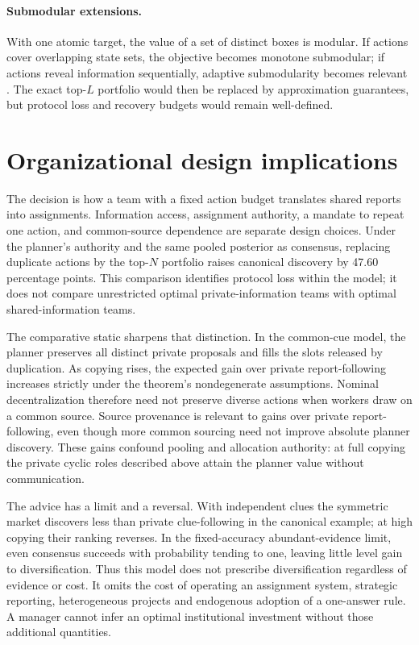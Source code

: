 \documentclass[11pt]{article}
\theoremstyle{definition}
\theoremstyle{remark}
\newcommand{\1}{\mathbf{1}}
\begin{document}
\paragraph{Submodular extensions.}
With one atomic target, the value of a set of distinct boxes is modular. If actions cover overlapping state sets, the objective becomes monotone submodular; if actions reveal information sequentially, adaptive submodularity becomes relevant \citep{NemhauserEtAl1978,GolovinKrause2011}. The exact top-$L$ portfolio would then be replaced by approximation guarantees, but protocol loss and recovery budgets would remain well-defined.

\section{Organizational design implications}
\label{sec:implications}

The decision is how a team with a fixed action budget translates shared reports into assignments. Information access, assignment authority, a mandate to repeat one action, and common-source dependence are separate design choices. Under the planner's authority and the same pooled posterior as consensus, replacing duplicate actions by the top-$N$ portfolio raises canonical discovery by 47.60 percentage points. This comparison identifies protocol loss within the model; it does not compare unrestricted optimal private-information teams with optimal shared-information teams.

The comparative static sharpens that distinction. In the common-cue model, the planner preserves all distinct private proposals and fills the slots released by duplication. As copying rises, the expected gain over private report-following increases strictly under the theorem's nondegenerate assumptions. Nominal decentralization therefore need not preserve diverse actions when workers draw on a common source. Source provenance is relevant to gains over private report-following, even though more common sourcing need not improve absolute planner discovery. These gains confound pooling and allocation authority: at full copying the private cyclic roles described above attain the planner value without communication.

The advice has a limit and a reversal. With independent clues the symmetric market discovers less than private clue-following in the canonical example; at high copying their ranking reverses. In the fixed-accuracy abundant-evidence limit, even consensus succeeds with probability tending to one, leaving little level gain to diversification. Thus this model does not prescribe diversification regardless of evidence or cost. It omits the cost of operating an assignment system, strategic reporting, heterogeneous projects and endogenous adoption of a one-answer rule. A manager cannot infer an optimal institutional investment without those additional quantities.
\end{document}
